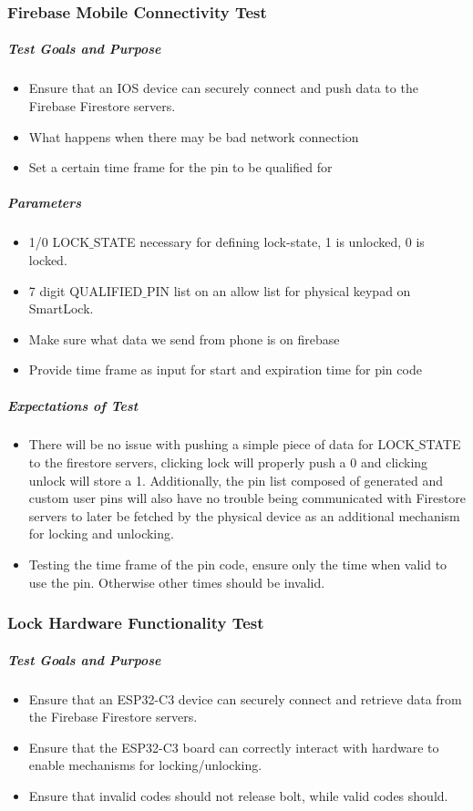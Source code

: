 \subsubsection*{Firebase Mobile Connectivity Test}
\subparagraph{Test Goals and Purpose}
\begin{itemize}
    \item Ensure that an IOS device can securely connect and push data to the Firebase Firestore servers.
    \item What happens when there may be bad network connection
    \item Set a certain time frame for the pin to be qualified for
\end{itemize}

\subparagraph{Parameters}
\begin{itemize}
    \item 1/0 LOCK$\_$STATE necessary for defining lock-state, 1 is unlocked, 0 is locked.
    \item 7 digit QUALIFIED$\_$PIN list on an allow list for physical keypad on SmartLock.
    \item Make sure what data we send from phone is on firebase
    \item Provide time frame as input for start and expiration time for pin code
\end{itemize}

\subparagraph{Expectations of Test}
\begin{itemize}
    \item There will be no issue with pushing a simple piece of data for LOCK$\_$STATE to the firestore servers, clicking lock will properly push a 0 and clicking unlock will store a 1. Additionally, the pin list composed of generated and custom user pins will also have no trouble being communicated with Firestore servers to later be fetched by the physical device as an additional mechanism for locking and unlocking.
    \item Testing the time frame of the pin code, ensure only the time when valid to use the pin. Otherwise other times should be invalid.
\end{itemize}

\subsubsection{Lock Hardware Functionality Test}
\subparagraph{Test Goals and Purpose}
\begin{itemize}
    \item Ensure that an ESP32-C3 device can securely connect and retrieve data from the Firebase Firestore servers.
    \item Ensure that the ESP32-C3 board can correctly interact with hardware to enable mechanisms for locking/unlocking.
    \item Ensure that invalid codes should not release bolt, while valid codes should.
\end{itemize}


